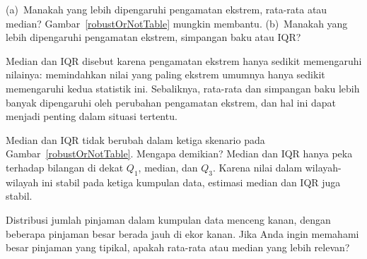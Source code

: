 \begin{exercisewrap}
\begin{nexercise} \label{interestRateWhichIsMoreRobust}
(a)~Manakah yang lebih dipengaruhi pengamatan ekstrem,
rata-rata atau median?
Gambar~\ref{robustOrNotTable} mungkin membantu.
(b)~Manakah yang lebih dipengaruhi pengamatan ekstrem,
simpangan baku atau IQR?\footnotemark{}
\end{nexercise}
\end{exercisewrap}

Median dan IQR disebut  karena pengamatan
ekstrem hanya sedikit memengaruhi nilainya: memindahkan nilai yang
paling ekstrem umumnya hanya sedikit memengaruhi kedua statistik
ini. Sebaliknya, rata-rata dan simpangan baku lebih banyak
dipengaruhi oleh perubahan pengamatan ekstrem, dan hal ini dapat
menjadi penting dalam situasi tertentu.

\begin{examplewrap}
\begin{nexample}{Median dan IQR tidak berubah dalam ketiga
    skenario pada Gambar~\ref{robustOrNotTable}.
    Mengapa demikian?}
  Median dan IQR hanya peka terhadap bilangan di dekat $Q_1$,
  median, dan $Q_3$. Karena nilai dalam wilayah-wilayah ini stabil
  pada ketiga kumpulan data, estimasi median dan IQR juga stabil.
\end{nexample}
\end{examplewrap}

\begin{exercisewrap}
\begin{nexercise}
Distribusi jumlah pinjaman dalam kumpulan data 
menceng kanan, dengan beberapa pinjaman besar berada jauh di ekor
kanan. Jika Anda ingin memahami besar pinjaman yang tipikal,
apakah rata-rata atau median yang lebih relevan?\footnotemark
\end{nexercise}
\end{exercisewrap}



